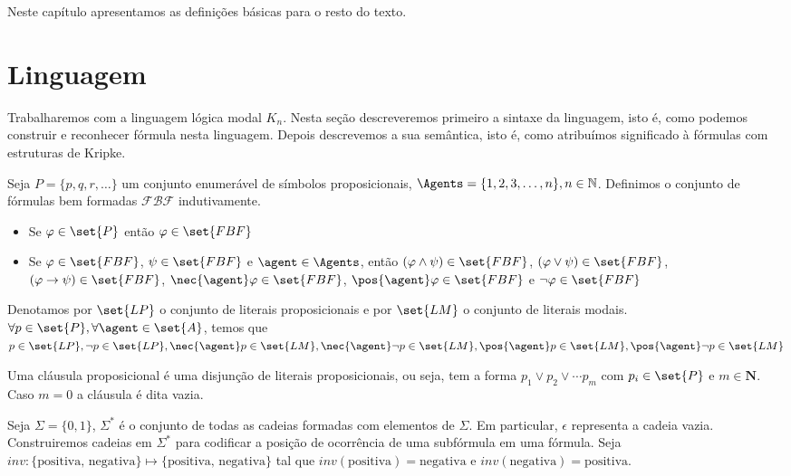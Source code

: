 
Neste capítulo apresentamos as definições básicas para o resto do texto.

\section{Linguagem}
Trabalharemos com a linguagem lógica modal $K_n$. Nesta seção descreveremos primeiro a sintaxe da linguagem, isto é, como podemos construir e reconhecer fórmula nesta linguagem. Depois descrevemos a sua semântica, isto é, como atribuímos significado à fórmulas com estruturas de Kripke. %

\begin{definition}
	Seja $P = \{p, q, r, \dots\}$ um conjunto enumerável de símbolos proposicionais, $\Agents = \{1, 2, 3, \dots, n\}, n \in \mathbb{N}$. Definimos o conjunto de fórmulas bem formadas $\mathcal{FBF}$ indutivamente.
	
	\begin{itemize}
		\item Se $\varphi \in \set{P}$ então $\varphi \in \set{FBF}$
		\item Se $\varphi \in \set{FBF}$, $\psi \in \set{FBF}$ e $\agent \in \Agents$, então $(\varphi \land \psi) \in \set{FBF}$, $(\varphi \lor \psi) \in \set{FBF}$, $(\varphi \rightarrow \psi) \in \set{FBF}$, $\nec{\agent} \varphi \in \set{FBF}$, $\pos{\agent} \varphi \in \set{FBF}$ e $\neg\varphi \in \set{FBF}$
	\end{itemize}
\end{definition}

\begin{definition}
	Denotamos por $\set{LP}$ o conjunto de literais proposicionais e por $\set{LM}$ o conjunto de literais modais.
	$\forall p \in \set{P}, \forall \agent \in \set{A}$, temos que $ p \in \set{LP}, \neg p \in \set{LP}, \nec{\agent} p \in \set{LM}, \nec{\agent} \neg p \in \set{LM}, \pos{\agent} p \in \set{LM}, \pos{\agent} \neg p \in \set{LM}$
\end{definition}

\begin{definition}
	Uma cláusula proposicional é uma disjunção de literais proposicionais, ou seja, tem a forma $p_1 \lor p_2 \lor \cdots p_m$ com $p_i \in \set{P}$ e $m \in \mathbf{N}$. Caso $m = 0$ a cláusula é dita vazia.
\end{definition}

Seja $\Sigma = \{0, 1\}$, $\Sigma^*$ é o conjunto de todas as cadeias formadas com elementos de $\Sigma$. Em particular, $\epsilon$ representa a cadeia vazia. Construiremos cadeias em $\Sigma^*$ para codificar a posição de ocorrência de uma subfórmula em uma fórmula. Seja $inv \colon \{\text{positiva, negativa}\} \mapsto \{\text{positiva, negativa}\}$ tal que $inv(\text{positiva}) = \text{negativa}$ e $inv(\text{negativa}) = \text{positiva}$.

